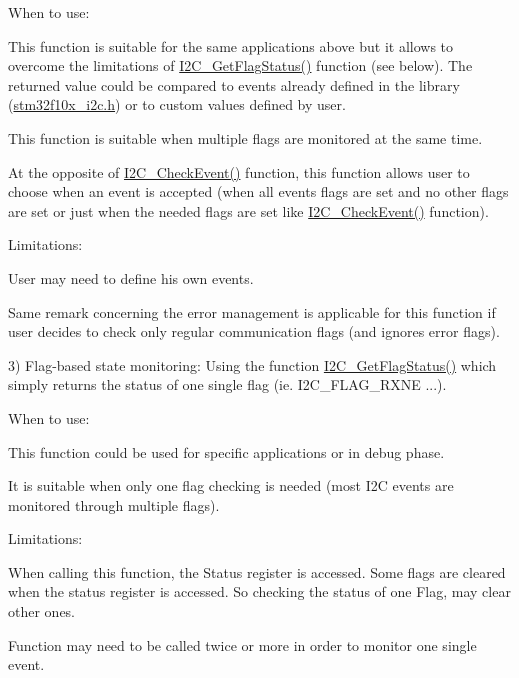 When to use\+:
\begin{DoxyItemize}
\item This function is suitable for the same applications above but it allows to overcome the limitations of \hyperlink{group___i2_c___private___functions_ga15c95d0ed124f029621a2061b1677ee7}{I2\+C\+\_\+\+Get\+Flag\+Status()} function (see below). The returned value could be compared to events already defined in the library (\hyperlink{stm32f10x__i2c_8h}{stm32f10x\+\_\+i2c.\+h}) or to custom values defined by user.
\item This function is suitable when multiple flags are monitored at the same time.
\item At the opposite of \hyperlink{group___i2_c___private___functions_ga2d5701342f9d4c1f09bf9d3cdcacc326}{I2\+C\+\_\+\+Check\+Event()} function, this function allows user to choose when an event is accepted (when all events flags are set and no other flags are set or just when the needed flags are set like \hyperlink{group___i2_c___private___functions_ga2d5701342f9d4c1f09bf9d3cdcacc326}{I2\+C\+\_\+\+Check\+Event()} function).
\end{DoxyItemize}

Limitations\+:
\begin{DoxyItemize}
\item User may need to define his own events.
\item Same remark concerning the error management is applicable for this function if user decides to check only regular communication flags (and ignores error flags).
\end{DoxyItemize}

3) Flag-\/based state monitoring\+: Using the function \hyperlink{group___i2_c___private___functions_ga15c95d0ed124f029621a2061b1677ee7}{I2\+C\+\_\+\+Get\+Flag\+Status()} which simply returns the status of one single flag (ie. I2\+C\+\_\+\+F\+L\+A\+G\+\_\+\+R\+X\+NE ...).
\begin{DoxyItemize}
\item When to use\+:
\begin{DoxyItemize}
\item This function could be used for specific applications or in debug phase.
\item It is suitable when only one flag checking is needed (most I2C events are monitored through multiple flags).
\end{DoxyItemize}
\item Limitations\+:
\begin{DoxyItemize}
\item When calling this function, the Status register is accessed. Some flags are cleared when the status register is accessed. So checking the status of one Flag, may clear other ones.
\item Function may need to be called twice or more in order to monitor one single event.
\end{DoxyItemize}
\end{DoxyItemize}

